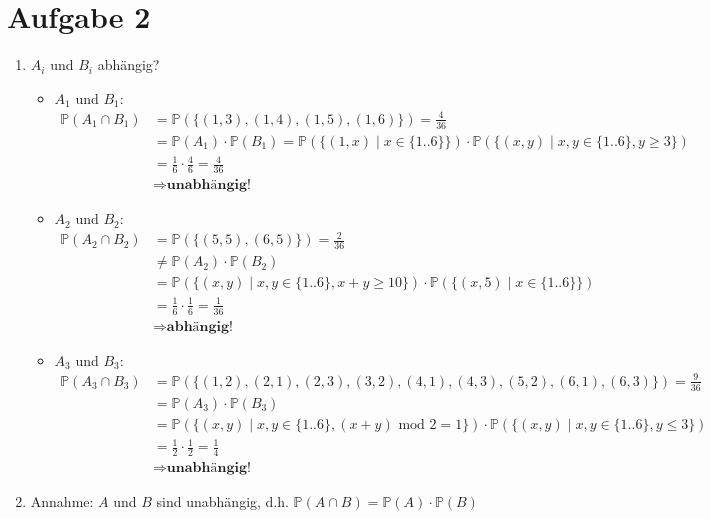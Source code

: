 \documentclass[10pt,a4paper,parskip=half]{scrartcl}
\newcommand{\PP}{\mathbb{P}}
\begin{document}
\section*{Aufgabe 2}
\begin{enumerate}
	\item $A_i$ und $B_i$ abhängig?
		\begin{itemize}
			\item $A_1$ und $B_1$: \\
				\begin{align*}
					\PP(A_1 \cap B_1) &= \PP(\{(1,3),(1,4),(1,5),(1,6)\})  = \frac{4}{36} \\
					&= \PP(A_1) \cdot \PP(B_1) =  \PP(\{(1,x) \mid x \in \{1..6\}\}) \cdot \PP(\{(x,y) \mid x,y \in \{1..6\}, y \ge 3\}) \\
					&= \frac{1}{6} \cdot \frac{4}{6} = \frac{4}{36} \\
					&\Rightarrow \textbf{unabhängig!}
				\end{align*}
			\item $A_2$ und $B_2$: \\
				\begin{align*}
					\PP(A_2 \cap B_2) &= \PP(\{(5,5),(6,5)\})  = \frac{2}{36} \\
					&\neq \PP(A_2) \cdot \PP(B_2) \\
					&= \PP(\{(x,y) \mid x,y \in \{1..6\}, x+y \ge 10\}) \cdot \PP(\{(x,5) \mid x \in \{1..6\}\}) \\
					&= \frac{1}{6} \cdot \frac{1}{6} = \frac{1}{36} \\
					&\Rightarrow \textbf{abhängig!}
				\end{align*}
			\item $A_3$ und $B_3$: \\
				\begin{align*}
					\PP(A_3 \cap B_3) &= \PP(\{(1, 2), (2, 1), (2, 3), (3, 2), (4, 1), (4, 3), (5, 2),(6, 1),(6, 3)\})  = \frac{9}{36} \\
					&= \PP(A_3) \cdot \PP(B_3) \\
					& = \PP(\{(x,y) \mid x,y \in \{1..6\}, (x + y) \text{ mod } 2 = 1\}) \cdot \PP(\{ (x,y) \mid x,y \in \{1..6\}, y \le 3\}) \\
					&= \frac{1}{2} \cdot \frac{1}{2} = \frac{1}{4} \\
					&\Rightarrow \textbf{unabhängig!}
				\end{align*}
		\end{itemize}
		\item 
		Annahme: $A$ und $B$ sind unabhängig, d.h. $\PP(A \cap B) = \PP(A) \cdot \PP(B)$

\end{enumerate}
\end{document}
